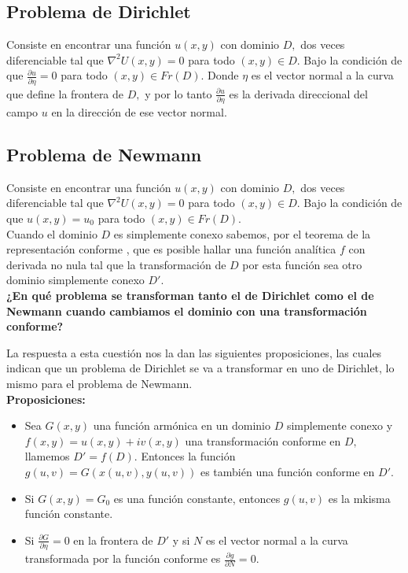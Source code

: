 \documentclass[a4paper]{article}
\begin{document}
\subsection{Problema de Dirichlet}
Consiste en encontrar una función $u(x,y)$ con dominio $D,$ dos veces diferenciable tal que $\nabla ^{2} U(x,y)=0$ para todo $(x,y)\in D.$ Bajo la condición de que $\frac{\partial u}{\partial \eta}=0$ para todo $(x,y) \in Fr(D).$ Donde $\eta$ es el vector normal a la curva que define la frontera de $D,$ y por lo tanto $\frac{\partial u}{\partial \eta}$ es la derivada direccional del campo $u$ en la dirección de ese vector normal.
 
\subsection{Problema de Newmann}
Consiste en encontrar una función $u(x,y)$ con dominio $D,$ dos veces diferenciable tal que $\nabla ^{2} U(x,y)=0$ para todo $(x,y)\in D.$ Bajo la condición de que $u(x,y)=u_{0}$ para todo $(x,y) \in Fr(D).$\\

Cuando el dominio $D$ es simplemente conexo sabemos, por el teorema de la representación conforme , que es posible hallar una función analítica $f$ con derivada no nula tal que  la transformación de $D$ por esta función sea otro dominio simplemente conexo $D'.$\\
\textbf{¿En qué problema se transforman tanto el de Dirichlet como el de Newmann cuando cambiamos el dominio con una transformación conforme?}

La respuesta a esta cuestión nos la dan las siguientes proposiciones, las cuales indican que un problema de Dirichlet se va a transformar en uno de Dirichlet, lo mismo para el problema de Newmann.\\

\textbf{Proposiciones:}\\
\begin{itemize}
\item Sea $G(x,y)$ una función armónica en un dominio $D$ simplemente conexo y $f(x,y)=u(x,y)+iv(x,y)$ una transformación conforme en $D,$ llamemos $D'=f(D).$ Entonces la función $g(u,v)=G(x(u,v), y(u,v))$ es también una función conforme en $D'.$
\item Si $G(x,y)=G_{0}$ es una función constante, entonces $g(u,v)$ es la mkisma función constante.
\item Si $\frac{\partial G}{\partial \eta}=0$ en la frontera de $D'$ y si $N$ es el vector normal a la curva transformada por la función conforme es $\frac{\partial g}{\partial N}=0.$
\end{itemize}
\end{document}
